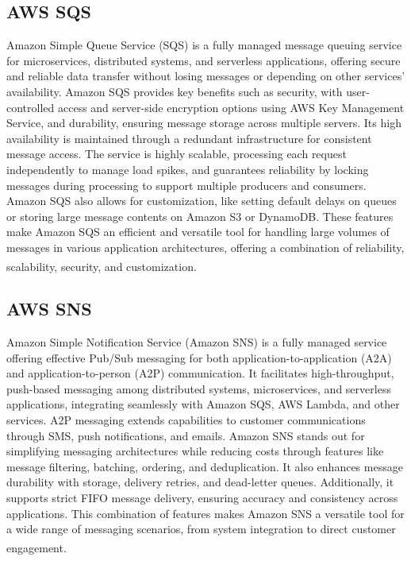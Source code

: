 \subsection{AWS SQS}
Amazon Simple Queue Service (SQS) is a fully managed message queuing service for microservices,
distributed systems, and serverless applications, offering secure and reliable data transfer without
losing messages or depending on other services' availability. Amazon SQS provides key benefits such
as security, with user-controlled access and server-side encryption options using AWS Key Management
Service, and durability, ensuring message storage across multiple servers. Its high availability is
maintained through a redundant infrastructure for consistent message access. The service is highly
scalable, processing each request independently to manage load spikes, and guarantees reliability by
locking messages during processing to support multiple producers and consumers. Amazon SQS also
allows for customization, like setting default delays on queues or storing large message contents on
Amazon S3 or DynamoDB. These features make Amazon SQS an efficient and versatile tool for handling
large volumes of messages in various application architectures, offering a combination of
reliability, scalability, security, and customization\textsuperscript{\cite{tech_5}}.

\subsection{AWS SNS}
Amazon Simple Notification Service (Amazon SNS) is a fully managed service offering effective
Pub/Sub messaging for both application-to-application (A2A) and application-to-person (A2P)
communication. It facilitates high-throughput, push-based messaging among distributed systems,
microservices, and serverless applications, integrating seamlessly with Amazon SQS, AWS Lambda, and
other services. A2P messaging extends capabilities to customer communications through SMS, push
notifications, and emails. Amazon SNS stands out for simplifying messaging architectures while
reducing costs through features like message filtering, batching, ordering, and deduplication. It
also enhances message durability with storage, delivery retries, and dead-letter queues.
Additionally, it supports strict FIFO message delivery, ensuring accuracy and consistency across
applications. This combination of features makes Amazon SNS a versatile tool for a wide range of
messaging scenarios, from system integration to direct customer
engagement\textsuperscript{\cite{tech_6}}.

